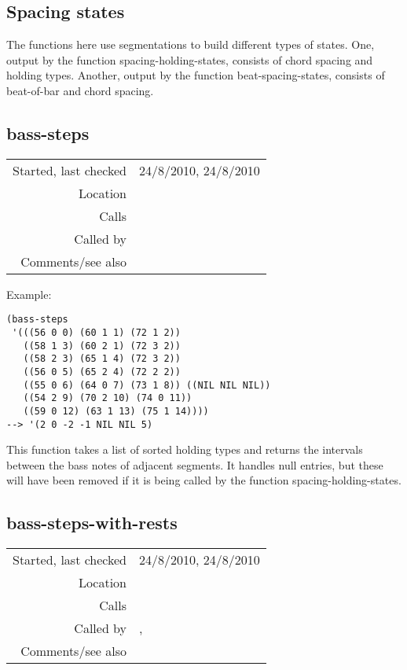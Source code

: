 \subsection{Spacing states}\label{sec:spacing-states}

The functions here use segmentations to build
different types of states. One, output by the function
spacing-holding-states, consists of chord spacing and
holding types. Another, output by the function
beat-spacing-states, consists of beat-of-bar and chord
spacing.


\subsection*{bass-steps}\label{fun:bass-steps}

\vspace{0.3cm}
\begin{tabular}{r|p{8cm}}
Started, last checked & 24/8/2010, 24/8/2010 \\
Location & \nameref{sec:spacing-states} \\
Calls & \\
Called by & \nameref{fun:spacing-holding-states} \\
Comments/see also & \nameref{fun:bass-steps-with-rests}
\end{tabular}

\vspace{0.5cm}
\noindent Example:
\begin{verbatim}
(bass-steps
 '(((56 0 0) (60 1 1) (72 1 2))
   ((58 1 3) (60 2 1) (72 3 2))
   ((58 2 3) (65 1 4) (72 3 2))
   ((56 0 5) (65 2 4) (72 2 2))
   ((55 0 6) (64 0 7) (73 1 8)) ((NIL NIL NIL))
   ((54 2 9) (70 2 10) (74 0 11))
   ((59 0 12) (63 1 13) (75 1 14))))
--> '(2 0 -2 -1 NIL NIL 5)
\end{verbatim}

\noindent This function takes a list of sorted holding
types and returns the intervals between the bass notes
of adjacent segments. It handles null entries, but
these will have been removed if it is being called
by the function spacing-holding-states.


\subsection*{bass-steps-with-rests}\label{fun:bass-steps-with-rests}

\vspace{0.3cm}
\begin{tabular}{r|p{8cm}}
Started, last checked & 24/8/2010, 24/8/2010 \\
Location & \nameref{sec:spacing-states} \\
Calls & \\
Called by & \nameref{fun:beat-spacing-states}, \nameref{fun:beat-spacing-states<-} \\
Comments/see also & \nameref{fun:bass-steps}
\end{tabular}

